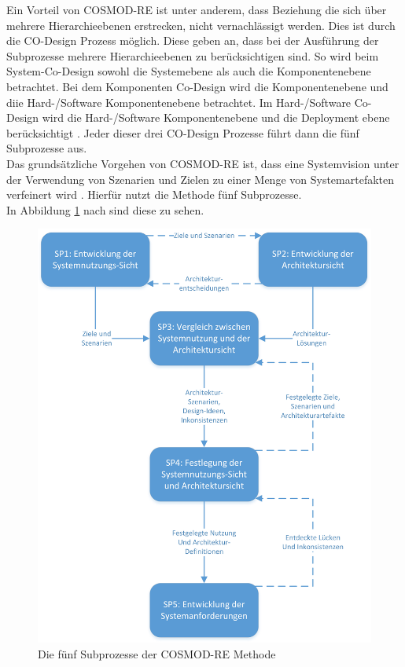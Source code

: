 Ein Vorteil von COSMOD-RE ist unter anderem, dass Beziehung die sich über mehrere Hierarchieebenen erstrecken, nicht vernachlässigt werden. Dies ist durch die CO-Design Prozess möglich. Diese geben an, dass bei der Ausführung der Subprozesse mehrere Hierarchieebenen zu berücksichtigen sind. So wird beim System-Co-Design sowohl die Systemebene als auch die Komponentenebene betrachtet. Bei dem Komponenten Co-Design wird die Komponentenebene und diie Hard-/Software Komponentenebene betrachtet. Im Hard-/Software Co-Design wird die Hard-/Software Komponentenebene und die Deployment ebene berücksichtigt \cite{Poh02}. Jeder dieser drei CO-Design Prozesse führt dann die fünf Subprozesse aus.\\ 

Das grundsätzliche Vorgehen von COSMOD-RE ist, dass eine Systemvision unter der Verwendung von Szenarien und Zielen zu einer Menge von Systemartefakten verfeinert wird \cite{Poh01}. Hierfür nutzt die Methode fünf Subprozesse. \\

In Abbildung \ref{pro5} nach \cite{Poh01} sind diese zu sehen. 

\begin{figure}[h]
	\centering
	\includegraphics[scale=0.65]{COSMODRE5prozesse.jpg} 
	\caption{Die fünf Subprozesse der COSMOD-RE Methode}\label{pro5}
\end{figure}

